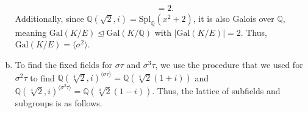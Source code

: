 \documentclass[10pt]{extarticle}
\newcommand{\Q}{\mathbb{Q}}
\begin{document}
\begin{enumerate}[(a)]
\begin{align*}
              &= 2.
      \end{align*}
      Additionally, since $\Q(\sqrt{2},i) = \text{Spl}_{\Q}(x^2 + 2)$, it is also Galois over $\Q$, meaning $\text{Gal}(K/E)\trianglelefteq \text{Gal}(K/\Q)$ with $|\text{Gal}(K/E)| = 2$. Thus, $\text{Gal}(K/E) = \langle \sigma^2\rangle$.
    \item To find the fixed fields for $\sigma\tau$ and $\sigma^3\tau$, we use the procedure that we used for $\sigma^2\tau$ to find $\Q(\sqrt[4]{2},i)^{\langle \sigma\tau\rangle} = \Q\left(\sqrt[4]{2}(1+i)\right)$ and $\Q(\sqrt[4]{2},i)^{\langle \sigma^3\tau\rangle} = \Q\left(\sqrt[4]{2}(1-i)\right)$. Thus, the lattice of subfields and subgroups is as follows.
      \begin{center}
\end{center}
\end{enumerate}
\end{document}
